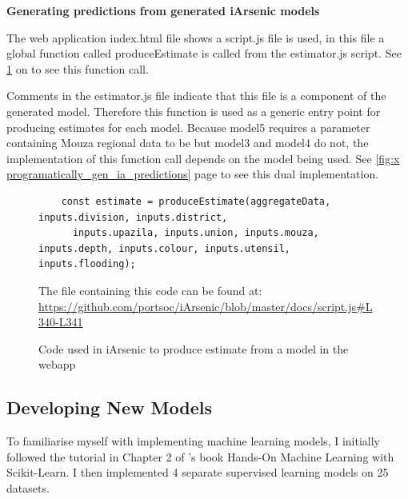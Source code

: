 \textbf{Generating predictions from generated iArsenic models}

The web application index.html file shows a script.js file is used, in this file a global function called produceEstimate is called from the estimator.js script. See \ref{fig:x produce_estimate_call} on \pageref{fig:x produce_estimate_call} to see this function call.

Comments in the estimator.js file indicate that this file is a component of the generated model. Therefore this function is used as a generic entry point for producing estimates for each model. Because model5 requires a parameter containing Mouza regional data to be but model3 and model4 do not, the implementation of this function call depends on the model being used. See \ref{fig:x programatically_gen_ia_predictions} page \pageref{fig:x programatically_gen_ia_predictions} to see this dual implementation.

\begin{figure}
    \begin{verbatim}
    const estimate = produceEstimate(aggregateData, inputs.division, inputs.district,
      inputs.upazila, inputs.union, inputs.mouza, inputs.depth, inputs.colour, inputs.utensil, inputs.flooding);
    \end{verbatim}
    \caption{Code used in iArsenic to produce estimate from a model in the webapp}
    \label{fig:x produce_estimate_call}
    \small The file containing this code can be found at: \url{https://github.com/portsoc/iArsenic/blob/master/docs/script.js#L340-L341}
\end{figure}

\subsection{Developing New Models}

To familiarise myself with implementing machine learning models, I initially followed the tutorial in Chapter 2 of \cite{Aurélien2017}'s book Hands-On Machine Learning with Scikit-Learn. I then implemented 4 separate supervised learning models on 25 datasets.


